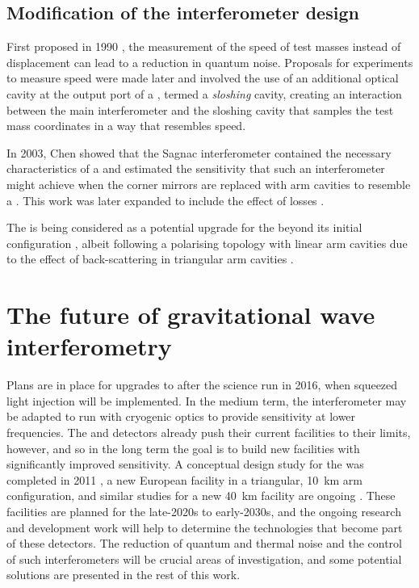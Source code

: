 \subsection{Modification of the interferometer design}
First proposed in 1990 \cite{Braginsky1990}, the measurement of the speed of test masses instead of displacement can lead to a reduction in quantum noise. Proposals for experiments to measure speed were made later and involved the use of an additional optical cavity at the output port of a \MI{} \cite{Braginsky2000, Purdue2002}, termed a \emph{sloshing} cavity, creating an interaction between the main interferometer and the sloshing cavity that samples the test mass coordinates in a way that resembles speed.

In 2003, Chen showed that the Sagnac interferometer contained the necessary characteristics of a \SM{} \cite{Chen2003} and estimated the sensitivity that such an interferometer might achieve when the corner mirrors are replaced with arm cavities to resemble a \FPMI{}. This work was later expanded to include the effect of losses \cite{Danilishin2004, Danilishin2015}.

The \SSM{} is being considered as a potential upgrade for the \ET{} beyond its initial configuration \cite{Wang2013, Huttner2016}, albeit following a polarising topology with linear arm cavities \cite{Danilishin2004} due to the effect of back-scattering in triangular arm cavities .

\section{The future of gravitational wave interferometry}
Plans are in place for upgrades to \ALIGO{} after the science run in 2016, when squeezed light injection will be implemented. In the medium term, the interferometer may be adapted to run with cryogenic optics to provide sensitivity at lower frequencies. The \ALIGO{} and \AVIRGO{} detectors already push their current facilities to their limits, however, and so in the long term the goal is to build new facilities with significantly improved sensitivity. A conceptual design study for the \ET{} was completed in 2011 \cite{ET2011}, a new European facility in a triangular, \SI{10}{\kilo\meter} arm configuration, and similar studies for a new \SI{40}{\kilo\meter} \LIGO{} facility are ongoing \cite{Dwyer2015, aligocosmic2016}. These facilities are planned for the late-2020s to early-2030s, and the ongoing research and development work will help to determine the technologies that become part of these detectors. The reduction of quantum and thermal noise and the control of such interferometers will be crucial areas of investigation, and some potential solutions are presented in the rest of this work.